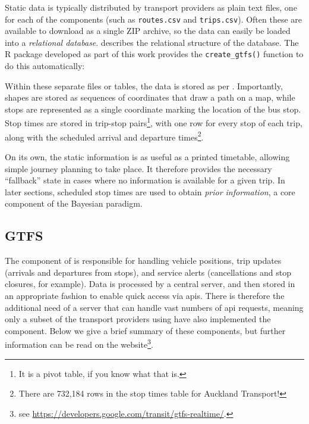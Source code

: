 Static \GTFS{} data is typically distributed by transport providers as plain text files, one for each of the components (such as \verb+routes.csv+ and \verb+trips.csv+). Often these are available to download as a single ZIP archive, so the data can easily be loaded into a \emph{relational database}.  describes the relational structure of the \GTFS{} database. The R package developed as part of this work provides the \verb+create_gtfs()+ function to do this automatically:
\begin{knitrout}\small
{}\color{fgcolor}\begin{kframe}
\begin{alltt}
 \hlkwb{<-} \hlstd{(}\hlstd{,}  \hlstd{=} \hlstd{)}
\end{alltt}
\end{kframe}
\end{knitrout}




Within these separate files or tables, the data is stored as per \GTFS{}. Importantly, shapes are stored as sequences of coordinates that draw a path on a map, while stops are represented as a single coordinate marking the location of the bus stop. Stop times are stored in trip-stop pairs\footnote{It is a pivot table, if you know what that is.}, with one row for every stop of each trip, along with the scheduled arrival and departure times\footnote{There are 732,184 rows in the stop times table for Auckland Transport!}.



On its own, the static \GTFS{} information is as useful as a printed timetable, allowing simple journey planning to take place. It therefore provides the necessary ``fallback'' state in cases where no \rt{} information is available for a given trip. In later sections, scheduled stop times are used to obtain \emph{prior information}, a core component of the Bayesian paradigm.



\subsection{\Rt{} GTFS}
\label{sec:gtfs_rt}

The \rt{} component of \GTFS{} is responsible for handling vehicle positions, trip updates (arrivals and departures from stops), and service alerts (cancellations and stop closures, for example). Data is processed by a central server, and then stored in an appropriate fashion to enable quick access via \glspl{api}. There is therefore the additional need of a server that can handle vast numbers of \gls{api} requests, meaning only a subset of the transport providers using \GTFS{} have also implemented the \rt{} component. Below we give a brief summary of these components, but further information can be read on the \GTFS{} website\footnote{see \url{https://developers.google.com/transit/gtfs-realtime/}.}.



